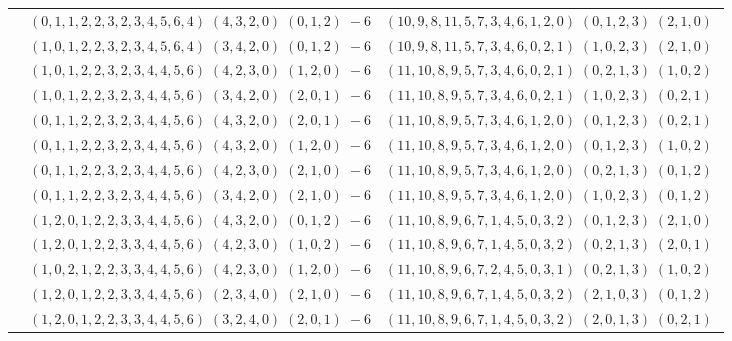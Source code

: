 \documentclass[11pt]{article}
\begin{document}
\begin{longtable}[l]{|c|c|c|}
 \cline{2-3} 
 & $(0 ,1 ,1 ,2 ,2 ,3 ,2 ,3 ,4 ,5 ,6 ,4) \;(4 ,3 ,2 ,0) \;(0 ,1 ,2) \;-6$ & $(10 ,9 ,8 ,11 ,5 ,7 ,3 ,4 ,6 ,1 ,2 ,0) \;(0 ,1 ,2 ,3) \;(2 ,1 ,0) \;$\\ 
 \cline{2-3} 
 & $(1 ,0 ,1 ,2 ,2 ,3 ,2 ,3 ,4 ,5 ,6 ,4) \;(3 ,4 ,2 ,0) \;(0 ,1 ,2) \;-6$ & $(10 ,9 ,8 ,11 ,5 ,7 ,3 ,4 ,6 ,0 ,2 ,1) \;(1 ,0 ,2 ,3) \;(2 ,1 ,0) \;$\\ 
 \cline{2-3} 
 & $(1 ,0 ,1 ,2 ,2 ,3 ,2 ,3 ,4 ,4 ,5 ,6) \;(4 ,2 ,3 ,0) \;(1 ,2 ,0) \;-6$ & $(11 ,10 ,8 ,9 ,5 ,7 ,3 ,4 ,6 ,0 ,2 ,1) \;(0 ,2 ,1 ,3) \;(1 ,0 ,2) \;$\\ 
 \cline{2-3} 
 & $(1 ,0 ,1 ,2 ,2 ,3 ,2 ,3 ,4 ,4 ,5 ,6) \;(3 ,4 ,2 ,0) \;(2 ,0 ,1) \;-6$ & $(11 ,10 ,8 ,9 ,5 ,7 ,3 ,4 ,6 ,0 ,2 ,1) \;(1 ,0 ,2 ,3) \;(0 ,2 ,1) \;$\\ 
 \cline{2-3} 
 & $(0 ,1 ,1 ,2 ,2 ,3 ,2 ,3 ,4 ,4 ,5 ,6) \;(4 ,3 ,2 ,0) \;(2 ,0 ,1) \;-6$ & $(11 ,10 ,8 ,9 ,5 ,7 ,3 ,4 ,6 ,1 ,2 ,0) \;(0 ,1 ,2 ,3) \;(0 ,2 ,1) \;$\\ 
 \cline{2-3} 
 & $(0 ,1 ,1 ,2 ,2 ,3 ,2 ,3 ,4 ,4 ,5 ,6) \;(4 ,3 ,2 ,0) \;(1 ,2 ,0) \;-6$ & $(11 ,10 ,8 ,9 ,5 ,7 ,3 ,4 ,6 ,1 ,2 ,0) \;(0 ,1 ,2 ,3) \;(1 ,0 ,2) \;$\\ 
 \cline{2-3} 
 & $(0 ,1 ,1 ,2 ,2 ,3 ,2 ,3 ,4 ,4 ,5 ,6) \;(4 ,2 ,3 ,0) \;(2 ,1 ,0) \;-6$ & $(11 ,10 ,8 ,9 ,5 ,7 ,3 ,4 ,6 ,1 ,2 ,0) \;(0 ,2 ,1 ,3) \;(0 ,1 ,2) \;$\\ 
 \cline{2-3} 
 & $(0 ,1 ,1 ,2 ,2 ,3 ,2 ,3 ,4 ,4 ,5 ,6) \;(3 ,4 ,2 ,0) \;(2 ,1 ,0) \;-6$ & $(11 ,10 ,8 ,9 ,5 ,7 ,3 ,4 ,6 ,1 ,2 ,0) \;(1 ,0 ,2 ,3) \;(0 ,1 ,2) \;$\\ 
 \cline{2-3} 
 & $(1 ,2 ,0 ,1 ,2 ,2 ,3 ,3 ,4 ,4 ,5 ,6) \;(4 ,3 ,2 ,0) \;(0 ,1 ,2) \;-6$ & $(11 ,10 ,8 ,9 ,6 ,7 ,1 ,4 ,5 ,0 ,3 ,2) \;(0 ,1 ,2 ,3) \;(2 ,1 ,0) \;$\\ 
 \cline{2-3} 
 & $(1 ,2 ,0 ,1 ,2 ,2 ,3 ,3 ,4 ,4 ,5 ,6) \;(4 ,2 ,3 ,0) \;(1 ,0 ,2) \;-6$ & $(11 ,10 ,8 ,9 ,6 ,7 ,1 ,4 ,5 ,0 ,3 ,2) \;(0 ,2 ,1 ,3) \;(2 ,0 ,1) \;$\\ 
 \cline{2-3} 
 & $(1 ,0 ,2 ,1 ,2 ,2 ,3 ,3 ,4 ,4 ,5 ,6) \;(4 ,2 ,3 ,0) \;(1 ,2 ,0) \;-6$ & $(11 ,10 ,8 ,9 ,6 ,7 ,2 ,4 ,5 ,0 ,3 ,1) \;(0 ,2 ,1 ,3) \;(1 ,0 ,2) \;$\\ 
 \cline{2-3} 
 & $(1 ,2 ,0 ,1 ,2 ,2 ,3 ,3 ,4 ,4 ,5 ,6) \;(2 ,3 ,4 ,0) \;(2 ,1 ,0) \;-6$ & $(11 ,10 ,8 ,9 ,6 ,7 ,1 ,4 ,5 ,0 ,3 ,2) \;(2 ,1 ,0 ,3) \;(0 ,1 ,2) \;$\\ 
 \cline{2-3} 
 & $(1 ,2 ,0 ,1 ,2 ,2 ,3 ,3 ,4 ,4 ,5 ,6) \;(3 ,2 ,4 ,0) \;(2 ,0 ,1) \;-6$ & $(11 ,10 ,8 ,9 ,6 ,7 ,1 ,4 ,5 ,0 ,3 ,2) \;(2 ,0 ,1 ,3) \;(0 ,2 ,1) \;$\\ 

\end{longtable}
\end{document}
